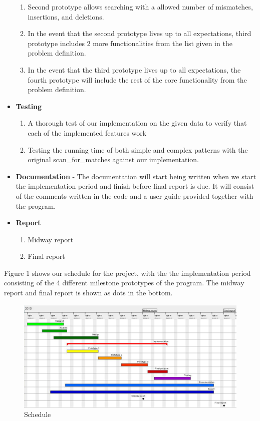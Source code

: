 \documentclass[12pt]{article}
\begin{document}
\begin{itemize}
\begin{enumerate}
\item Second prototype allows searching with a allowed number of mismatches, insertions, and deletions.
\item In the event that the second prototype lives up to all expectations, third prototype includes 2 more functionalities from the list given in the problem definition.
\item In the event that the third prototype lives up to all expectations, the fourth prototype will include the rest of the core functionality from the problem definition.
\end{enumerate}
\item \textbf{Testing}
\begin{enumerate}
\item A thorough test of our implementation on the given data to verify that each of the implemented features work
\item Testing the running time of both simple and complex patterns with the original scan\_for\_matches against our
implementation.
\end{enumerate}
\item \textbf{Documentation} - The documentation will start being written when we start the implementation period
and finish before final report is due. It will consist of the comments written in the code and a user guide provided 
together with the program.
\item \textbf{Report}
\begin{enumerate}
\item Midway report
\item Final report
\end{enumerate}
\end{itemize}
Figure 1 shows our schedule for the project, with the the implementation period consisting of the 4 different milestone
prototypes of the program. The midway report and final report is shown as dots in the bottom.
\begin{figure}[h!]
\includegraphics[scale=0.7]{gantt.PNG}
\caption{Schedule}
\end{figure}
\end{document}
